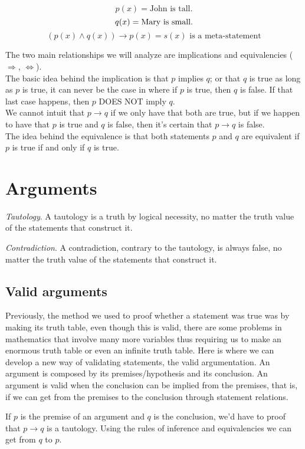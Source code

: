 \documentclass{report}
\begin{document}
        \[p(x) = \text{John is tall.}\]
        \[q(x) = \text{Mary is small.}\\\]
        \[(p(x) \land q(x)) \rightarrow p(x) = s(x) \text{ is a meta-statement}\]

        The two main relationships we will analyze are implications and equivalencies ($\Rightarrow$, $\Leftrightarrow$).\\

        The basic idea behind the implication is that $p$ implies $q$; or that $q$ is true as long as $p$ is true, it can never be the case in where if $p$ is true, then $q$ is false. If that last case happens, then $p$ DOES NOT imply $q$.\\

        We cannot intuit that $p \rightarrow q$ if we only have that both are true, but if we happen to have that $p$ is true and $q$ is false, then it's certain that $p \rightarrow q$ is false.\\

        The idea behind the equivalence is that both statements $p$ and $q$ are equivalent if $p$ is true if and only if $q$ is true.

    \section{Arguments}
        \begin{defBox}
            \textit{Tautology}. A tautology is a truth by logical necessity, no matter the truth value of the statements that construct it.
        \end{defBox}
        \begin{defBox}
            \textit{Contradiction}. A contradiction, contrary to the tautology, is always false, no matter the truth value of the statements that construct it.
        \end{defBox}

        \subsection{Valid arguments}
            Previously, the method we used to proof whether a statement was true was by making its truth table, even though this is valid, there are some problems in mathematics that involve many more variables thus requiring us to make an enormous truth table or even an infinite truth table. Here is where we can develop a new way of validating statements, the valid argumentation. An argument is composed by its premises/hypothesis and its conclusion. An argument is valid when the conclusion can be implied from the premises, that is, if we can get from the premises to the conclusion through statement relations.

            If $p$ is the premise of an argument and $q$ is the conclusion, we'd have to proof that $p \rightarrow q$ is a tautology. Using the rules of inference and equivalencies we can get from $q$ to $p$.
\end{document}
